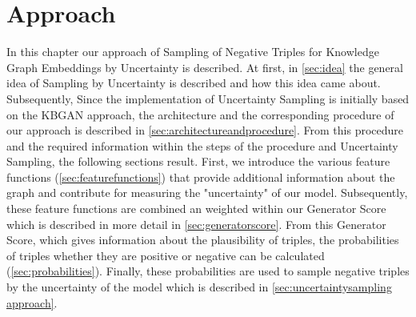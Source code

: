 \chapter{Approach}
\label{ch:approach}

In this chapter our approach of Sampling of Negative Triples for Knowledge Graph Embeddings by Uncertainty is described.
At first, in \autoref{sec:idea} the general idea of Sampling by Uncertainty is described and how this idea came about.
Subsequently, 
Since the implementation of Uncertainty Sampling is initially based on the \ac{KBGAN} approach, the architecture and the corresponding procedure of our approach is described in \autoref{sec:architectureandprocedure}.
From this procedure and the required information within the steps of the procedure and Uncertainty Sampling, the following sections result.
First, we introduce the various feature functions (\autoref{sec:featurefunctions}) that provide additional information about the graph and contribute for measuring the "uncertainty" of our model.
Subsequently, these feature functions are combined an weighted within our Generator Score which is described in more detail in \autoref{sec:generatorscore}.
From this Generator Score, which gives information about the plausibility of triples, the probabilities of triples whether they are positive or negative can be calculated (\autoref{sec:probabilities}). 
Finally, these probabilities are used to sample negative triples by the uncertainty of the model which is described in \autoref{sec:uncertaintysampling approach}.

















